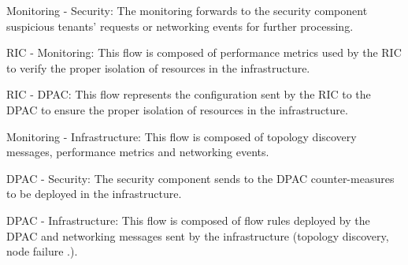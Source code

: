 Monitoring - Security: The monitoring forwards to the security component suspicious tenants' requests or networking events for further processing.

 RIC - Monitoring: This flow is composed of performance metrics used by the RIC to verify the proper isolation of resources in the infrastructure.

 RIC - DPAC: This flow represents the configuration sent by the RIC to the DPAC to ensure the proper isolation of resources in the infrastructure.

 Monitoring - Infrastructure: This flow is composed of topology discovery messages, performance metrics and networking events.

 DPAC - Security: The security component sends to the DPAC counter-measures to be deployed in the infrastructure.

 DPAC - Infrastructure: This flow is composed of flow rules deployed by the DPAC and networking messages sent by the infrastructure (\eg topology discovery, node failure \etc.).


